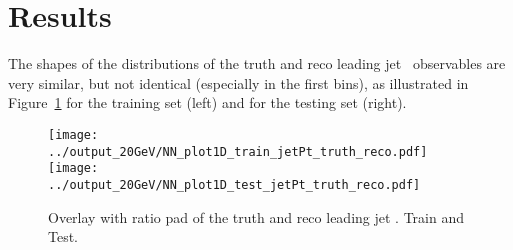 \section{Results}
\label{sec:Results}

The shapes of the distributions of the truth and reco leading jet \pt~observables are very similar, but not identical (especially in the first bins), as illustrated in Figure~\ref{fig:jetPt} for the training set (left) and for the testing set (right).

\begin{figure}[h]
  \centering
  \texttt{[image: ../output\_20GeV/NN\_plot1D\_train\_jetPt\_truth\_reco.pdf]}
  \texttt{[image: ../output\_20GeV/NN\_plot1D\_test\_jetPt\_truth\_reco.pdf]}
  \caption{Overlay with ratio pad of the truth and reco leading jet \pt. Train and Test.}
  \label{fig:jetPt}
\end{figure}
